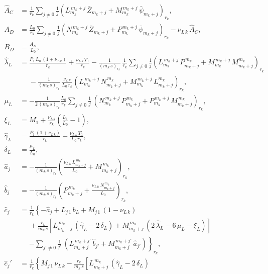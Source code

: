 \documentclass[12pt,prb,aps]{revtex4-1}
\begin{document}
\begin{align}
\hat{A}_{C} &= \frac{1}{r_k}\sum_{j\neq 0}\frac{1}{j}\left(L_{m_k}^{\,m_k+j}\,\bar{Z}_{m_k+j}+ M_{m_k}^{\,m_k+j}\,\bar{\psi}_{m_k+j}\right)_{r_k},\\[0.5ex]
A_{D} &=  \frac{L_0}{r_k}\sum_{j\neq 0}\frac{1}{j}\left(N_{m_k}^{\,m_k+j}\,\bar{Z}_{m_k+j}+ P_{m_k}^{\,m_k+j}\,\bar{\psi}_{m_k+j}\right)_{r_k} -\nu_{L\,k}\,\hat{A}_C,
\\[0.5ex]
B_{D} &= \frac{A_{D}}{L_0},\\[0.5ex]
\hat{\lambda}_{L} &= \frac{P_1\,L_0\,(1+\nu_{L\,k}) }{r_k} + \frac{\nu_{L\,k}\,T_1}{r_k}
-\frac{1}{(m_k\,s)_{r_k}}\,\frac{1}{r_k}\sum_{j\neq 0}\frac{1}{j}\left(L_{m_k}^{\,m_k+j}\,P_{m_k+j}^{\,m_k}+M_{m_k}^{\,m_k+j}\,M_{m_k+j}^{m_k}\right)_{r_k}\nonumber\\[0.5ex]&\phantom{=}
- \frac{1}{(m_k\,s)_{r_k}}\,\frac{\nu_{L\,k}}{L_0\,r_k}
\left(L_{m_k}^{\,m_k+j}\,N_{m_k+j}^{\,m_k}+M_{m_k}^{\,m_k+j}\,L_{m_k+j}^{m_k}\right)_{r_k},\\[0.5ex]
\mu_{L}&= -\frac{1}{2\,(m_k\,s)_{r_k}}\frac{L_0}{r_k}\sum_{j\neq 0}\frac{1}{j}\,(N_{m_k}^{\,m_k+j}\,P_{m_k+j}^{\,m_k}+P_{m_k}^{\,m_k+j}\,M_{m_k+j}^{\,m_k})_{r_k},\\[0.5ex]
\xi_{L} &= M_1+ \frac{\nu_{L\,k}}{r_k} \left(\frac{L_1}{L_0}-1\right),\\[0.5ex]
\hat{\gamma}_{L} &=\frac{P_1\,(1+\nu_{L\,k})}{r_k} + \frac{\nu_{L\,k}\,T_1}{L_0\,r_k},\\[0.5ex]
\delta_{L} &= \frac{\mu_{L}}{L_0},\\[0.5ex]
\hat{a}_j&=-\frac{1}{(m_k\,s)_{r_k}}\left(\frac{\nu_{L\,k}\,L^{\,m_k}_{m_k+j}}{L_0}+M^{\,m_k}_{m_k+j}\right)_{r_k},\\[0.5ex]
\hat{b}_j&=- \frac{1}{(m_k\,s)_{r_k}}\left(P^{\,m_k}_{m_k+j}+\frac{\nu_{L\,k}\,N^{\,m_k}_{m_k+j}}{L_0}\right)_{r_k},\\[0.5ex]
\hat{c}_j&= \frac{1}{r_k}\left\{
-\hat{a}_j + L_{j\,1}\,b_L + M_{j\,1}\,(1-\nu_{L\,k})\phantom{\frac{a}{a}}\right.\nonumber\\[0.5ex]&\phantom{=} + \frac{r_k}{m_k\,s}\left[L_{m_k+j}^{\,m_k}\,(\hat{\gamma}_L-2\,\delta_L)
+ M_{m_k+j}^{\,m_k}\,(2\,\hat{\lambda}_L-6\,\mu_L-\xi_L)\right]\nonumber\\[0.5ex]&\phantom{=}
\left.-\sum_{j'\neq 0} \frac{1}{j'}\,(L_{m_k+j}^{\,m_k+j'}\,\hat{b}_{j'}+ M_{m_k+j}^{\,m_k+j'}\,\hat{a}_{j'})
\right\}_{r_k},\\[0.5ex]
\hat{c}_j'&= \frac{1}{r_k}\left\{
 M_{j\,1}\,\nu_{L\,k}- \frac{r_k}{m_k\,s}\left[L_{m_k+j}^{\,m_k}\,(\hat{\gamma}_L-2\,\delta_L)

\end{align}
\end{document}
